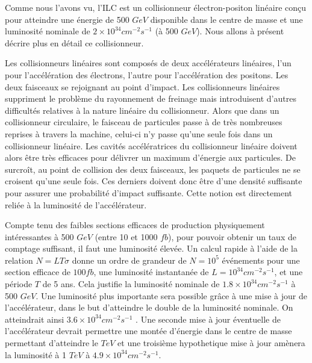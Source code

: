   
  Comme nous l'avons vu, l'ILC est un collisionneur \'electron-positon lin\'eaire conçu pour atteindre une \'energie de 500 $GeV$ disponible dans le centre de masse et une luminosit\'e nominale de $2 \times 10^{34} cm^{-2}s^{-1}$ (\`a 500 $GeV$). Nous allons \`a pr\'esent d\'ecrire plus en d\'etail ce collisionneur.
  
  \medskip
  
  Les collisionneurs lin\'eaires sont compos\'es de deux acc\'el\'erateurs lin\'eaires, l'un pour l'acc\'el\'eration des \'electrons, l'autre pour l'acc\'el\'eration des positons. Les deux faisceaux se rejoignant au point d'impact. Les collisionneurs lin\'eaires suppriment le probl\`eme du rayonnement de freinage mais introduisent d'autres difficult\'es relatives \`a la nature lin\'eaire du collisionneur. Alors que dans un collisionneur circulaire, le faisceau de particules passe \`a de tr\`es nombreuses reprises \`a travers la machine, celui-ci n'y passe qu'une seule fois dans un collisionneur lin\'eaire. Les cavit\'es acc\'el\'eratrices du collisionneur lin\'eaire doivent alors \^etre tr\`es efficaces pour d\'elivrer un maximum d'\'energie aux particules. De surcroît, au point de collision des deux faisceaux, les paquets de particules ne se croisent qu'une seule fois. Ces derniers doivent donc \^etre d'une densit\'e suffisante pour assurer une probabilit\'e d'impact suffisante. Cette notion est directement reli\'ee \`a la luminosit\'e de l'acc\'el\'erateur. 
  
  \medskip
  
  Compte tenu des faibles sections efficaces de production physiquement int\'eressantes \`a 500 $GeV$ (entre 10 et 1000 $fb$), pour pouvoir obtenir un taux de comptage suffisant, il faut une luminosit\'e \'elev\'ee. Un calcul rapide \`a l'aide de la relation $N = L T \sigma$ donne un ordre de grandeur de $N = 10^5$ \'ev\'enements pour une section efficace de $100 fb$, une luminosit\'e instantan\'ee de $L = 10^{34}cm^{-2}s^{-1}$, et une p\'eriode $T$ de 5 ans. Cela justifie la luminosit\'e nominale de $1.8 \times 10^{34}cm^{-2}s^{-1}$ \`a 500 $GeV$. Une luminosit\'e plus importante sera possible grâce \`a une mise à jour de l'accélérateur, dans le but d'atteindre le double de la luminosit\'e nominale. On atteindrait ainsi $3.6 \times 10^{34}cm^{-2}s^{-1}$ . Une seconde mise \`a jour \'eventuelle de l'accélérateur devrait permettre une mont\'ee d'\'energie dans le centre de masse permettant d'atteindre le $TeV$ et une troisi\`eme hypothetique mise \`a jour am\`enera la luminosit\'e \`a 1 $TeV$ \`a $4.9 \times 10^{34}cm^{-2}s^{-1}$.
  
